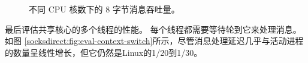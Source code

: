 \begin{figure}[htbp]
	
	\caption{不同 CPU 核数下的 8 字节消息吞吐量。}
	\label{socksdirect:fig:eval-corenum-tput}
\end{figure}




最后评估共享核心的多个线程的性能。 每个线程都需要等待轮到它来处理消息。
如图 \ref {socksdirect:fig:eval-context-switch}所示，尽管消息处理延迟几乎与活动进程的数量呈线性增长，但它仍然是Linux的1/20到1/30。


